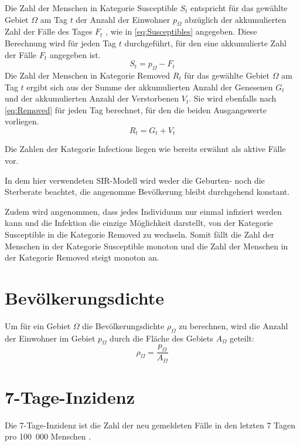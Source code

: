 Die Zahl der Menschen in Kategorie \glqq{}Susceptible\grqq{} $S_t$ entspricht für das gewählte Gebiet $\Omega$ am Tag $t$ der Anzahl der Einwohner $p_{\Omega}$ abzüglich der akkumulierten Zahl der Fälle des Tages $F_t$ , wie in \autoref{eq:Susceptibles} angegeben. Diese Berechnung wird für jeden Tag $t$ durchgeführt, für den eine akkumulierte Zahl der Fälle $F_t$ angegeben ist.
    \begin{equation}\label{eq:Susceptibles}
        S_t=p_{\Omega}-F_t
    \end{equation}
Die Zahl der Menschen in Kategorie \glqq{}Removed\grqq{} $R_t$ für das gewählte Gebiet $\Omega$ am Tag $t$ ergibt sich aus der Summe der akkumulierten Anzahl der Genesenen $G_t$ und der akkumulierten Anzahl der Verstorbenen $V_t$. Sie wird ebenfalls nach \autoref{eq:Removed} für jeden Tag berechnet, für den die beiden Ausgangswerte vorliegen.
\begin{equation}\label{eq:Removed}
    R_t=G_t+V_t
\end{equation}

Die Zahlen der Kategorie \glqq{}Infectious\grqq{} liegen wie bereits erwähnt als aktive Fälle vor.

In dem hier verwendeten SIR-Modell wird weder die Geburten- noch die Sterberate beachtet, die angenomme Bevölkerung bleibt durchgehend konstant.

Zudem wird angenommen, dass jedes Individuum nur einmal infiziert werden kann und die Infektion die einzige Möglichkeit darstellt, von der Kategorie \glqq{}Susceptible\grqq{} in die Kategorie \glqq{}Removed\grqq{} zu wechseln.
Somit fällt die Zahl der Menschen in der Kategorie \glqq{}Susceptible\grqq{} monoton und die Zahl der Menschen in der Kategorie \glqq{}Removed\grqq{} steigt monoton an.\autocite{SIR}

\section{Bevölkerungsdichte}
Um für ein Gebiet $\Omega$ die Bevölkerungsdichte $\rho_{\Omega}$ zu berechnen, wird die Anzahl der Einwohner im Gebiet $p_{\Omega}$ durch die Fläche des Gebiets $A_{\Omega}$ geteilt:
\begin{equation}\label{eq:Bevölkerungsdichte}
    \rho_{\Omega} = \frac{p_{\Omega}}{A_{\Omega}}
\end{equation}
\section{7-Tage-Inzidenz}\label{sec:Grundlagen:7-Tages Inzidenz}
Die 7-Tage-Inzidenz ist die Zahl der neu gemeldeten Fälle in den letzten 7 Tagen pro 100~000 Menschen \autocite{7-TageInzidenz}.

